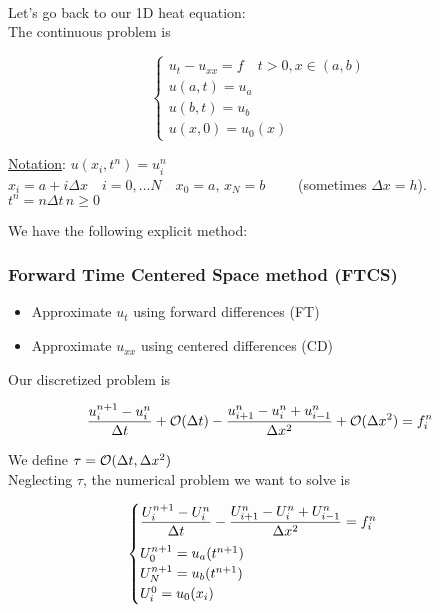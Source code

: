 \-\\

Let's go back to our 1D heat equation: \\

The continuous problem is 

\[
\begin{cases}
  u_t - u_{xx} = f \quad t>0, x\in(a,b)\\
  u(a,t) = u_a\\
  u(b,t) = u_b \\
  u(x,0) = u_0(x)
\end{cases}
\]

\underline{Notation}: $u(x_i,t^n) = u_i^n$ \\
$x_i = a + i\Delta x \quad i = 0,\ldots N \quad x_0 = a,\, x_N = b \qquad$ (sometimes $\Delta x = h$).\\
$t^n = n\Delta t \, n\geq0$\\

\newpage

We have the following explicit method:

\subsubsection{Forward Time Centered Space method (FTCS)}

\begin{itemize}
    \item Approximate $u_t$ using forward differences (FT)
    \item Approximate $u_{xx}$ using centered differences (CD)
\end{itemize}

Our discretized problem is

\[
  \frac{u_i^{n+1} - u_i^n}{\Delta t} + \mathcal{O}(\Delta t) - \frac{u_{i+1}^n - u_i^n + u_{i-1}^n}{\Delta x^2} + \mathcal{O}(\Delta x^2) = f_i^n
\]

We define $\tau = \mathcal{O}(\Delta t,\Delta x^2)$ \\

Neglecting $\tau$, the numerical problem we want to solve is

\[
  \begin{cases}
    \dfrac{U_i^{n+1} - U_i^n}{\Delta t} - \dfrac{U_{i+1}^n - U_i^n + U_{i-1}^n}{\Delta x^2} = f_i^n \vspace{0.2cm}\\
    U_0^{n+1} = u_a(t^{n+1})\\
    U_N^{n+1} = u_b(t^{n+1}) \\
    U_i^0 = u_0(x_i)
  \end{cases}
\]

